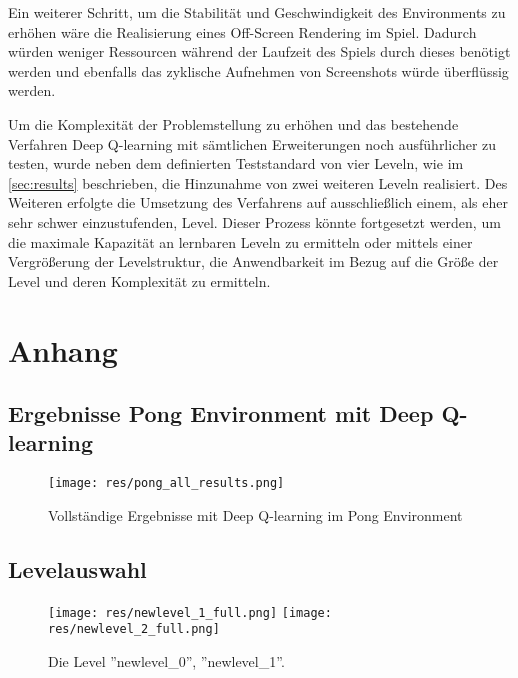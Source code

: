 \documentclass[11pt]{scrartcl}
\begin{document}
Ein weiterer Schritt, um die Stabilität und Geschwindigkeit des Environments zu erhöhen wäre die
Realisierung eines Off-Screen Rendering im Spiel. Dadurch würden weniger Ressourcen während der
Laufzeit des Spiels durch dieses benötigt werden und ebenfalls das zyklische Aufnehmen von
Screenshots würde überflüssig werden.

Um die Komplexität der Problemstellung zu erhöhen und das bestehende Verfahren Deep Q-learning mit
sämtlichen Erweiterungen noch ausführlicher zu testen, wurde neben dem definierten Teststandard von
vier Leveln, wie im \autoref{sec:results} beschrieben, die Hinzunahme von zwei weiteren Leveln
realisiert. Des Weiteren erfolgte die Umsetzung des Verfahrens auf ausschließlich einem, als eher
sehr schwer einzustufenden, Level. Dieser Prozess könnte fortgesetzt werden, um die maximale
Kapazität an lernbaren Leveln zu ermitteln oder mittels einer Vergrößerung der Levelstruktur, die
Anwendbarkeit im Bezug auf die Größe der Level und deren Komplexität zu ermitteln.


\newpage
%


\newpage
\listoffigures 
\listoftables 

\newpage
\section{Anhang}

\subsection{Ergebnisse Pong Environment mit Deep Q-learning}
\begin{figure}[htp]
\centering
\texttt{[image: res/pong\_all\_results.png]}
\caption{Vollständige Ergebnisse mit Deep Q-learning im Pong Environment}
\label{fig:pong_all_results}
\end{figure}

\subsection{Levelauswahl}
\label{sec:levels}
\begin{figure}[htp]
\centering
\texttt{[image: res/newlevel\_1\_full.png]}
\texttt{[image: res/newlevel\_2\_full.png]}
\caption{
  Die Level ''newlevel\_0'', ''newlevel\_1''.
        }
\end{figure}
\end{document}
